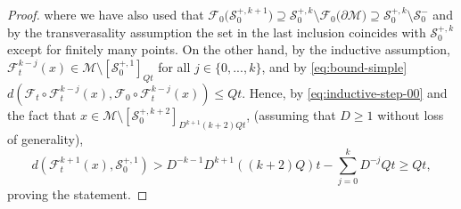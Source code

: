 \documentclass{amsart}
\numberwithin{equation}{section}
\renewcommand{\ge}{\geqslant}
\renewcommand{\le}{\leqslant}
\newcommand\cF{{\mathcal F}}
\newcommand\cM{{\mathcal M}}
\newcommand\cS{{\mathcal S}}
\begin{document}
\begin{proof}
where we have also used that \(\cF_0\bigl(\cS_{0}^{+,k+1} \bigr) \supseteq \cS_{0}^{+,k} \setminus \cF_{0}\bigl( \partial \cM \bigr) \supseteq \cS_{0}^{+,k} \setminus \cS_0^{-}\) and by the transverasality assumption the set in the last inclusion coincides with \(\cS_{0}^{+,k}\) except for finitely many points. On the other hand, by the inductive assumption, \(\cF_t^{k-j}(x) \in \cM \setminus [\cS_{0}^{+,1}]_{Q t}\) for all \(j \in \{0,...,k\}\), and by \eqref{eq:bound-simple} \(d(\cF_t\circ \cF_t^{k-j}(x), \cF_0 \circ \cF_t^{k-j}(x)) \le Qt\). Hence, by \eqref{eq:inductive-step-00} and the fact that \(x \in \cM \setminus [\cS_0^{+,k+2}]_{D^{k+1}(k+2)Qt}\), (assuming that \(D \ge 1\) without loss of generality),
\[
d\left(\cF_t^{k+1}(x), \cS_0^{+,1}\right) > D^{-k-1}D^{k+1}((k+2)Q)t - \sum_{j=0}^{k}D^{-j}Qt  \ge Qt,
\]
proving the statement.
\end{proof}
\end{document}
